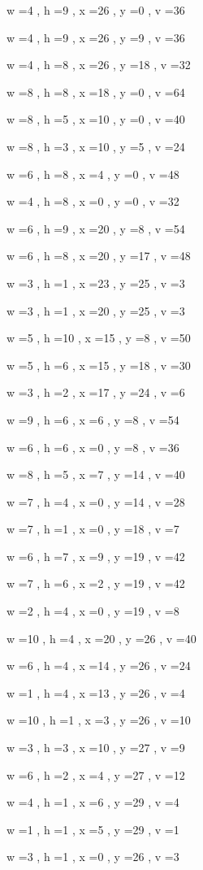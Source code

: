 \documentclass[11pt]{article}
\begin{document}
w =4 , h =9 , x =26 , y =0 , v =36
\par
w =4 , h =9 , x =26 , y =9 , v =36
\par
w =4 , h =8 , x =26 , y =18 , v =32
\par
w =8 , h =8 , x =18 , y =0 , v =64
\par
w =8 , h =5 , x =10 , y =0 , v =40
\par
w =8 , h =3 , x =10 , y =5 , v =24
\par
w =6 , h =8 , x =4 , y =0 , v =48
\par
w =4 , h =8 , x =0 , y =0 , v =32
\par
w =6 , h =9 , x =20 , y =8 , v =54
\par
w =6 , h =8 , x =20 , y =17 , v =48
\par
w =3 , h =1 , x =23 , y =25 , v =3
\par
w =3 , h =1 , x =20 , y =25 , v =3
\par
w =5 , h =10 , x =15 , y =8 , v =50
\par
w =5 , h =6 , x =15 , y =18 , v =30
\par
w =3 , h =2 , x =17 , y =24 , v =6
\par
w =9 , h =6 , x =6 , y =8 , v =54
\par
w =6 , h =6 , x =0 , y =8 , v =36
\par
w =8 , h =5 , x =7 , y =14 , v =40
\par
w =7 , h =4 , x =0 , y =14 , v =28
\par
w =7 , h =1 , x =0 , y =18 , v =7
\par
w =6 , h =7 , x =9 , y =19 , v =42
\par
w =7 , h =6 , x =2 , y =19 , v =42
\par
w =2 , h =4 , x =0 , y =19 , v =8
\par
w =10 , h =4 , x =20 , y =26 , v =40
\par
w =6 , h =4 , x =14 , y =26 , v =24
\par
w =1 , h =4 , x =13 , y =26 , v =4
\par
w =10 , h =1 , x =3 , y =26 , v =10
\par
w =3 , h =3 , x =10 , y =27 , v =9
\par
w =6 , h =2 , x =4 , y =27 , v =12
\par
w =4 , h =1 , x =6 , y =29 , v =4
\par
w =1 , h =1 , x =5 , y =29 , v =1
\par
w =3 , h =1 , x =0 , y =26 , v =3
\par
\newpage
\end{document}
